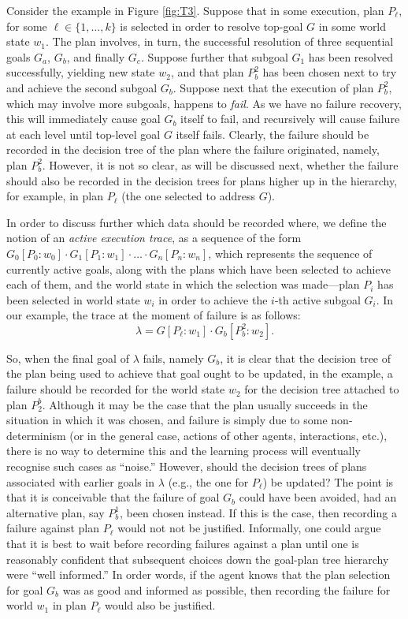 Consider the example in Figure \ref{fig:T3}.
Suppose that in some execution, plan $P_\ell$, for some $\ell \in \{1,\ldots,k\}$
is selected in order to resolve top-goal $G$ in some world state $w_1$. The plan
involves, in turn, the successful resolution of three sequential goals $G_a$,
$G_b$, and finally $G_c$. Suppose further that subgoal $G_1$ has been resolved
successfully, yielding new state $w_2$, and that plan $P_b^2$ has been chosen
next to try and achieve the second subgoal $G_b$.
Suppose next that the execution of plan $P_b^2$, which may involve more subgoals,
happens to \emph{fail}. As we have no failure recovery, this will immediately
cause goal $G_b$ itself to fail, and recursively will cause failure at each level
until top-level goal $G$ itself fails.
Clearly, the failure should be recorded in the decision tree of the plan where
the failure originated, namely, plan $P_b^2$. However, it is not so clear, as
will be discussed next, whether the failure should also be recorded in the
decision trees for plans higher up in the hierarchy, for example, in plan
$P_\ell$ (the one selected to address $G$).


In order to discuss further which data should be recorded where, we define the
notion of an \textit{active execution trace}, as a sequence of the form
$G_0[P_0:w_0] \cdot G_1[P_1:w_1] \cdot \ldots \cdot G_n[P_n:w_n]$, which
represents the sequence of currently active goals, along with the plans which
have been selected to achieve each of them, and the world state in which the
selection was made---plan $P_i$ has been selected in world state $w_i$ in order
to achieve the $i$-th active subgoal $G_i$.
In our example, the trace at the moment of failure is as follows:
\[ \lambda=G[P_\ell:w_1] \cdot G_b[P_b^2:w_2]. \]


So, when the final goal of $\lambda$ fails, namely $G_b$, it is clear that the
decision tree of the plan being used to achieve that goal ought to be updated, in
the example, a failure should be recorded for the world state $w_2$ for the
decision tree attached to plan $P_2^b$.  Although it may be the case that the
plan usually succeeds in the situation in which it was chosen, and failure is
simply due to some non-determinism (or in the general case, actions of other
agents, interactions, etc.), there is no way to determine this and the learning
process will eventually recognise such cases as ``noise.''
However, should the decision trees of plans associated with earlier goals in
$\lambda$ (e.g., the one for $P_\ell$) be updated?  The point is that it is
conceivable that the failure of goal $G_b$ could have been avoided, had an
alternative plan, say $P_b^1$, been chosen instead. If this is the case, then
recording a failure against plan $P_\ell$ would not not be justified.
Informally, one could argue that it is best to wait before recording failures
against a plan until one is reasonably confident that subsequent choices down the
goal-plan tree hierarchy were ``well informed.'' In order words, if the agent
knows that the plan selection for goal $G_b$ was as good and informed as
possible, then recording the failure for world $w_1$ in plan $P_\ell$ would
also be justified.


